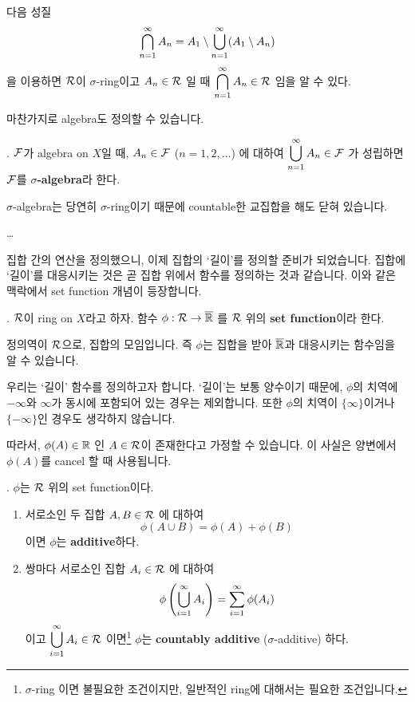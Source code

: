 \rmk 다음 성질
\[
    \bigcap_{n=1}^\infty A_n = A_1 \setminus \bigcup_{n=1}^\infty (A_1 \setminus A_n)
\]
을 이용하면 \(\mathcal{R}\)이 \(\sigma\)-ring이고 \(A_n \in \mathcal{R}\) 일 때 \(\displaystyle \bigcap_{n=1}^\infty A_n \in \mathcal{R}\) 임을 알 수 있다.

마찬가지로 algebra도 정의할 수 있습니다.

.  \(\mathcal{F}\)가 algebra on \(X\)일 때, \(A_n \in \mathcal{F}\) (\(n = 1, 2, \dots\)) 에 대하여 \(\displaystyle \bigcup_{n=1}^\infty A_n \in \mathcal{F}\) 가 성립하면 \(\mathcal{F}\)를 \textbf{\(\sigma\)-algebra}라 한다.

\(\sigma\)-algebra는 당연히 \(\sigma\)-ring이기 때문에 countable한 교집합을 해도 닫혀 있습니다.

\dots

집합 간의 연산을 정의했으니, 이제 집합의 `길이'를 정의할 준비가 되었습니다. 집합에 `길이'를 대응시키는 것은 곧 집합 위에서 함수를 정의하는 것과 같습니다. 이와 같은 맥락에서 set function 개념이 등장합니다.

.  \(\mathcal{R}\)이 ring on \(X\)라고 하자. 함수 \(\phi : \mathcal{R} \rightarrow \overline{\mathbb{R}}\) 를 \(\mathcal{R}\) 위의 \textbf{set function}이라 한다.

정의역이 \(\mathcal{R}\)으로, 집합의 모임입니다. 즉 \(\phi\)는 집합을 받아 \(\overline{\mathbb{R}}\)과 대응시키는 함수임을 알 수 있습니다.

우리는 `길이' 함수를 정의하고자 합니다. `길이'는 보통 양수이기 때문에, \(\phi\)의 치역에 \(-\infty\)와 \(\infty\)가 동시에 포함되어 있는 경우는 제외합니다. 또한 \(\phi\)의 치역이 \(\{\infty\}\)이거나 \(\{-\infty\}\)인 경우도 생각하지 않습니다.

따라서, \(\phi(A) \in \mathbb{R}\) 인 \(A \in \mathcal{R}\)이 존재한다고 가정할 수 있습니다. 이 사실은 양변에서 \(\phi(A)\)를 cancel 할 때 사용됩니다.

. \(\phi\)는 \(\mathcal{R}\) 위의 set function이다.
\begin{enumerate}
    \item 서로소인 두 집합 \(A, B \in \mathcal{R}\) 에 대하여
          \[
              \phi(A\cup B) = \phi(A) + \phi(B)
          \]
          이면 \(\phi\)는 \textbf{additive}하다.

    \item 쌍마다 서로소인 집합 \(A_i \in \mathcal{R}\) 에 대하여
          \[
              \phi\left( \bigcup_{i=1}^\infty A_i \right) = \sum_{i=1}^\infty \phi(A_i)
          \]
          이고 \(\displaystyle \bigcup_{i=1}^\infty A_i \in \mathcal{R}\) 이면\footnote{\(\sigma\)-ring 이면 불필요한 조건이지만, 일반적인 ring에 대해서는 필요한 조건입니다.} \(\phi\)는 \textbf{countably additive} (\(\sigma\)-additive) 하다.
\end{enumerate}

